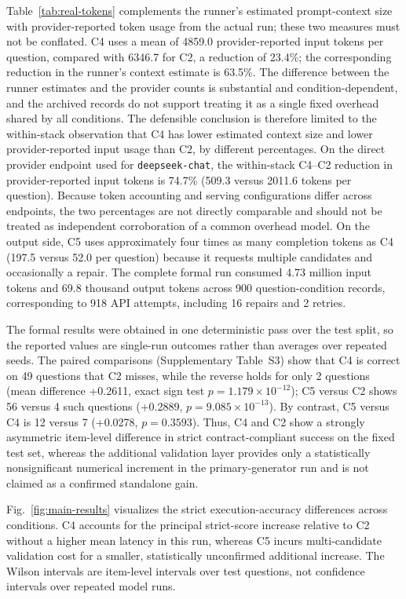 \documentclass[cmc,article,submit,moreauthors,pdftex]{Definitions/tsp}
\begin{document}
Table~\ref{tab:real-tokens} complements the runner's estimated prompt-context size with provider-reported token usage from the actual run; these two measures must not be conflated. C4 uses a mean of 4859.0 provider-reported input tokens per question, compared with 6346.7 for C2, a reduction of 23.4\%; the corresponding reduction in the runner's context estimate is 63.5\%. The difference between the runner estimates and the provider counts is substantial and condition-dependent, and the archived records do not support treating it as a single fixed overhead shared by all conditions. The defensible conclusion is therefore limited to the within-stack observation that C4 has lower estimated context size and lower provider-reported input usage than C2, by different percentages. On the direct provider endpoint used for \texttt{deepseek-chat}, the within-stack C4--C2 reduction in provider-reported input tokens is 74.7\% (509.3 versus 2011.6 tokens per question). Because token accounting and serving configurations differ across endpoints, the two percentages are not directly comparable and should not be treated as independent corroboration of a common overhead model. On the output side, C5 uses approximately four times as many completion tokens as C4 (197.5 versus 52.0 per question) because it requests multiple candidates and occasionally a repair. The complete formal run consumed 4.73 million input tokens and 69.8 thousand output tokens across 900 question-condition records, corresponding to 918 API attempts, including 16 repairs and 2 retries.

The formal results were obtained in one deterministic pass over the test split, so the reported values are single-run outcomes rather than averages over repeated seeds. The paired comparisons (Supplementary Table~S3) show that C4 is correct on 49 questions that C2 misses, while the reverse holds for only 2 questions (mean difference +0.2611, exact sign test $p = 1.179\times10^{-12}$); C5 versus C2 shows 56 versus 4 such questions (+0.2889, $p = 9.085\times10^{-13}$). By contrast, C5 versus C4 is 12 versus 7 (+0.0278, $p = 0.3593$). Thus, C4 and C2 show a strongly asymmetric item-level difference in strict contract-compliant success on the fixed test set, whereas the additional validation layer provides only a statistically nonsignificant numerical increment in the primary-generator run and is not claimed as a confirmed standalone gain.

Fig.~\ref{fig:main-results} visualizes the strict execution-accuracy differences across conditions. C4 accounts for the principal strict-score increase relative to C2 without a higher mean latency in this run, whereas C5 incurs multi-candidate validation cost for a smaller, statistically unconfirmed additional increase. The Wilson intervals are item-level intervals over test questions, not confidence intervals over repeated model runs.
\end{document}
